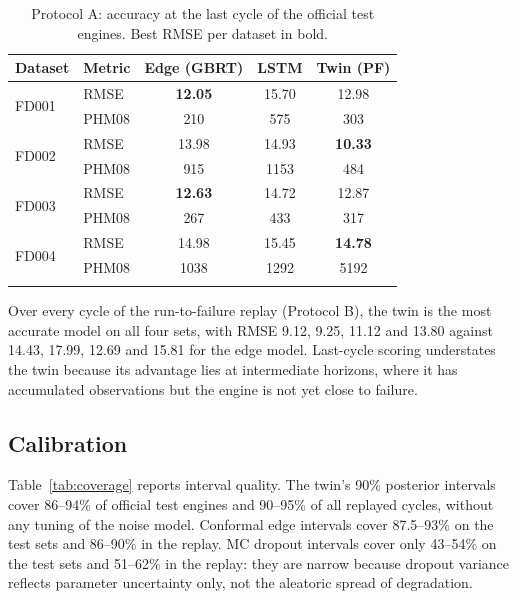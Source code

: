 \documentclass[pdflatex,sn-mathphys-num]{sn-jnl}
\begin{document}
\begin{table}[t]
\caption{Protocol A: accuracy at the last cycle of the official test engines. Best RMSE per dataset in bold.}\label{tab:accuracy}
\begin{tabular*}{\textwidth}{@{\extracolsep\fill}llccc}
\toprule
Dataset & Metric & Edge (GBRT) & LSTM & Twin (PF) \\
\midrule
\multirow{2}{*}{FD001} & RMSE  & \textbf{12.05} & 15.70 & 12.98 \\
                       & PHM08 & 210 & 575 & 303 \\
\multirow{2}{*}{FD002} & RMSE  & 13.98 & 14.93 & \textbf{10.33} \\
                       & PHM08 & 915 & 1153 & 484 \\
\multirow{2}{*}{FD003} & RMSE  & \textbf{12.63} & 14.72 & 12.87 \\
                       & PHM08 & 267 & 433 & 317 \\
\multirow{2}{*}{FD004} & RMSE  & 14.98 & 15.45 & \textbf{14.78} \\
                       & PHM08 & 1038 & 1292 & 5192 \\
\botrule
\end{tabular*}
\end{table}

Over every cycle of the run-to-failure replay (Protocol B), the twin is the most accurate model on all four sets, with RMSE 9.12, 9.25, 11.12 and 13.80 against 14.43, 17.99, 12.69 and 15.81 for the edge model. Last-cycle scoring understates the twin because its advantage lies at intermediate horizons, where it has accumulated observations but the engine is not yet close to failure.

\subsection{Calibration}
Table~\ref{tab:coverage} reports interval quality. The twin's 90\% posterior intervals cover 86--94\% of official test engines and 90--95\% of all replayed cycles, without any tuning of the noise model. Conformal edge intervals cover 87.5--93\% on the test sets and 86--90\% in the replay. MC dropout intervals cover only 43--54\% on the test sets and 51--62\% in the replay: they are narrow because dropout variance reflects parameter uncertainty only, not the aleatoric spread of degradation.
\end{document}
